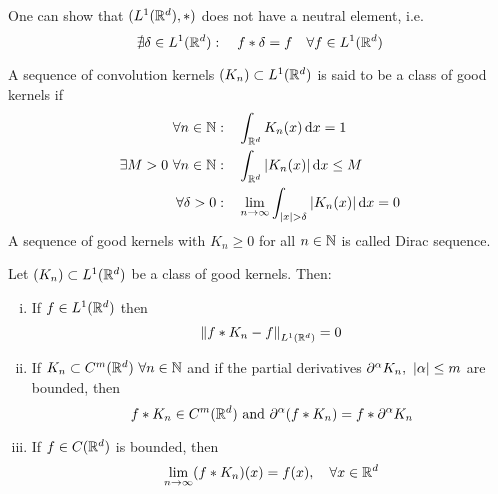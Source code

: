 \documentclass[../../script.tex]{subfiles}
\begin{document}
\begin{rem}
    One can show that $(L^1(\realn^d), *)$ does not have a neutral element, i.e.
    \[
        \nexists \delta \in L^1(\realn^d): \quad f * \delta = f \quad \forall f \in L^1(\realn^d)
    \]
\end{rem}

\begin{defi}
    A sequence of convolution kernels $\anyseqdef[K]{L^1(\realn^d)}$ is said to be a class of good kernels if 
    \begin{align*}
        \forall n \in \natn: &\quad \int_{\realn^d} K_n(x) \dd{x} = 1 \\
        \exists M > 0 ~\forall n \in \natn: &\quad \int_{\realn^d}\abs{K_n(x)} \dd{x} \le M \\
        \forall \delta > 0: &\quad \limn \int_{\abs{x} > \delta} \abs{K_n(x)} \dd{x} = 0
    \end{align*}
    A sequence of good kernels with $K_n \ge 0$ for all $n \in \natn$ is called Dirac sequence.
\end{defi}

\begin{thm}\label{thm:10.42}
    Let $\anyseqdef[K]{L^1(\realn^d)}$ be a class of good kernels. Then:
    \begin{enumerate}[(i)]
        \item If $f \in L^1(\realn^d)$ then 
        \[
            \norm{f * K_n - f}_{L^1(\realn^d)} = 0
        \]
        \item If $K_n \subset C^m(\realn^d) ~\forall n \in \natn$ and if the partial derivatives $\partial^{\alpha} K_n, ~\abs{\alpha} \le m$ are bounded, then 
        \[
            f * K_n \in C^m(\realn^d) \text{ and } \partial^{\alpha} (f * K_n) = f * \partial^{\alpha} K_n
        \]
        \item If $f \in C(\realn^d)$ is bounded, then 
        \[
            \limn (f * K_n)(x) = f(x), \quad \forall x \in \realn^d
        \]
    \end{enumerate}
\end{thm}
\end{document}
